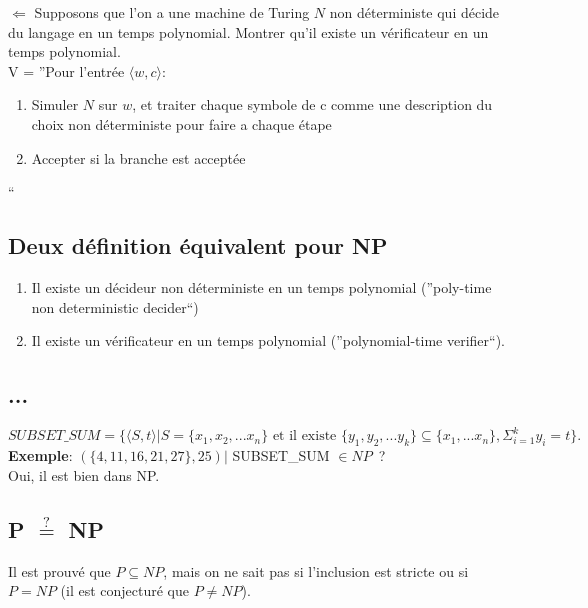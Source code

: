 \documentclass[a4paper,12pt]{article}
\begin{document}
    $\Leftarrow$ Supposons que l'on a une machine de Turing $N$ non déterministe qui décide du langage en un temps polynomial.
		Montrer qu'il existe un vérificateur en un temps polynomial.\\
		V = ''Pour l'entrée $\langle w, c\rangle$:
    \begin{enumerate}
     \item Simuler $N$ sur $w$, et traiter chaque symbole de c comme une description du choix non déterministe pour faire a chaque étape
     \item Accepter si la branche est acceptée
    \end{enumerate}``\\

  \subsection{Deux définition équivalent pour NP}
    \begin{enumerate}
     \item Il existe un décideur non déterministe en un temps polynomial (''poly-time non deterministic decider``)
     \item Il existe un vérificateur en un temps polynomial (''polynomial-time verifier``).
    \end{enumerate}

  \subsection{...}
    \[SUBSET\_SUM = \{\langle S, t\rangle | S = \{x_1, x_2, ... x_n\} \text{ et il existe } \{y_1, y_2, ... y_k\} \subseteq \{x_1, ... x_n\}, \Sigma_{i=1}^k y_i = t\}.\]
    \textbf{Exemple}: $\left(\{4, 11, 16, 21, 27\}, 25\right) | $ SUBSET\_SUM $\in NP$~?\\
    Oui, il est bien dans NP.

  \subsection{P $\overset ?=$ NP}
		Il est prouvé que $P \subseteq NP$, mais on ne sait pas si l'inclusion est stricte ou si $P = NP$ (il est conjecturé que $P \neq NP$).
\end{document}

